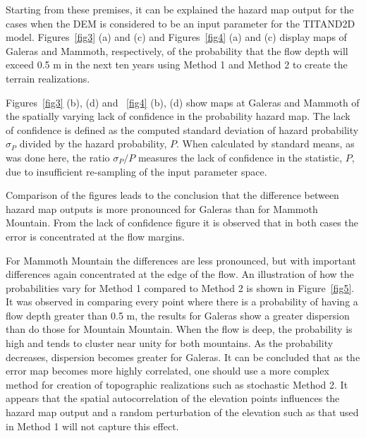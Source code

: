 \documentclass[12pt]{article}
\begin{document}
Starting from these premises, it can be explained the hazard map output for
the cases when the DEM is considered to be an input parameter for the
TITAND2D model.  Figures~\ref{fig3} (a) and (c)  and Figures~\ref{fig4} 
(a) and (c) display maps of Galeras and Mammoth, respectively, of the 
probability that the flow depth will exceed 0.5 m in the next ten years 
using Method 1 and Method 2 to create the terrain realizations.
 
Figures~\ref{fig3} (b), (d) and ~\ref{fig4} (b), (d) show maps at Galeras and Mammoth of
the spatially varying lack of confidence in the probability hazard map. The lack of
confidence is defined as the computed standard deviation of hazard
probability $\sigma_P$ divided by the hazard probability, $P$.  When
calculated by standard means, as was done here, the ratio $\sigma_P/P$
measures the lack of confidence in the statistic, $P$, due to
insufficient re-sampling of the input parameter space.


Comparison of the figures leads to the conclusion that the
difference between hazard map outputs is more pronounced for Galeras than
for Mammoth Mountain. From the lack of confidence figure it is
observed that in both cases the error is concentrated at the flow margins.

For Mammoth Mountain the differences are less pronounced, but with
important differences again concentrated at the edge of the flow.  An
illustration of how the probabilities vary for Method 1 compared to
Method 2 is shown in Figure~\ref{fig5}. It was observed in comparing every
point where there is a probability of having a flow depth greater than
0.5 m, the results for Galeras show a greater dispersion than do those
for Mountain Mountain.  When the flow is deep, the probability is high
and tends to cluster near unity for both mountains.  As the
probability decreases, dispersion becomes greater for Galeras.  It can be
concluded that as the error map becomes more highly correlated, one
should use a more complex method for creation of topographic
realizations such as stochastic Method 2. It appears that the spatial
autocorrelation of the elevation points influences the hazard map
output and a random perturbation of the elevation such as that used in
Method 1 will not capture this effect.
\end{document}
